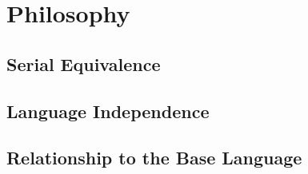 \section{Philosophy}
\label{sec:philosophy}



\subsection{Serial Equivalence}
\label{sub:serial_equivalence}

\subsection{Language Independence}
\label{sub:language_independence}

\subsection{Relationship to the Base Language}
\label{sub:relationship_to_the_base_language}




